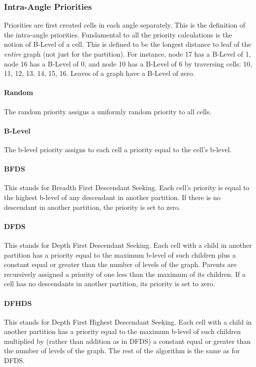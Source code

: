 \documentclass[12pt,letterpaper]{article}
\begin{document}
\subsubsection{Intra-Angle Priorities}
Priorities are first created cells in each angle separately.
This is the definition of the intra-angle priorities.
Fundamental to all the priority calculations is the notion of B-Level of a cell.
This is defined to be the longest distance to leaf of the {\em entire} graph (not just for the partition).
For instance, node 17 has a B-Level of 1, node 16 has a B-Level of 0, and node 10 has a B-Level of 6 by traversing cells: 10, 11, 12, 13, 14, 15, 16.
Leaves of a graph have a B-Level of zero.

\paragraph{Random}
The random priority assigns a uniformly random priority to all cells.

\paragraph{B-Level}
The b-level priority assigns to each cell a priority equal to the cell's b-level.

\paragraph{BFDS}
This stands for Breadth First Descendant Seeking.
Each cell's priority is equal to the highest b-level of any descendant in another partition.
If there is no descendant in another partition, the priority is set to zero.

\paragraph{DFDS}
This stands for Depth First Descendant Seeking.
Each cell with a child in another partition has a priority equal to the maximum b-level of such children plus a constant equal or greater than the number of levels of the graph.
Parents are recursively assigned a priority of one less than the maximum of its children.
If a cell has no descendants in another partition, its priority is set to zero.

\paragraph{DFHDS}
This stands for Depth First Highest Descendant Seeking.
Each cell with a child in another partition has a priority equal to the maximum b-level of such children multiplied by (rather than addition as in DFDS) a constant equal or greater than the number of levels of the graph.
The rest of the algorithm is the same as for DFDS.
\end{document}
